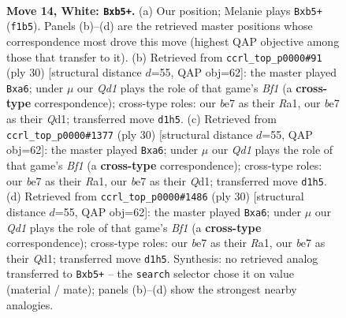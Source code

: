 \documentclass[11pt]{article}
\begin{document}
\clearpage

\begin{figure}[p]\centering
\begin{subfigure}{0.46\textwidth}\centering
\resizebox{\linewidth}{!}{%
\newchessgame
\chessboard[
  setfen={rnbqk2r/4bp2/8/pp1p3p/3Pp2P/8/PP3PP1/R2QKBNR w KQkq - 0 14},
  showmover=false,
  pgfstyle=straightmove, color=movearrow, markmove={f1-b5}
]}
\caption{}
\end{subfigure}\hfill
\begin{subfigure}{0.46\textwidth}\centering
\resizebox{\linewidth}{!}{%
\newchessgame
\chessboard[
  setfen={1r1qk2r/3b1ppp/p2p4/3Np1b1/pP2P3/8/1P3PPP/R2QKB1R w KQk - 1 16},
  showmover=false,
  pgfstyle=straightmove, color=movearrow, markmove={f1-a6}
]}
\caption{}
\end{subfigure}
\\[4pt]
\begin{subfigure}{0.46\textwidth}\centering
\resizebox{\linewidth}{!}{%
\newchessgame
\chessboard[
  setfen={1r1qk2r/3b1ppp/p2p4/3Np1b1/pP2P3/8/1P3PPP/R2QKB1R w KQk - 1 16},
  showmover=false,
  pgfstyle=straightmove, color=movearrow, markmove={f1-a6}
]}
\caption{}
\end{subfigure}\hfill
\begin{subfigure}{0.46\textwidth}\centering
\resizebox{\linewidth}{!}{%
\newchessgame
\chessboard[
  setfen={1r1qk2r/3b1ppp/p2p4/3Np1b1/pP2P3/8/1P3PPP/R2QKB1R w KQk - 1 16},
  showmover=false,
  pgfstyle=straightmove, color=movearrow, markmove={f1-a6}
]}
\caption{}
\end{subfigure}
\caption{\textbf{Move 14, White: \texttt{Bxb5+}.} (a) Our position; Melanie plays \texttt{Bxb5+} (\texttt{f1b5}). Panels (b)--(d) are the retrieved master positions whose correspondence most drove this move (highest QAP objective among those that transfer to it). (b) Retrieved from \texttt{ccrl\_top\_p0000\#91} (ply 30) [structural distance $d$=55, QAP obj=62]: the master played \texttt{Bxa6}; under $\mu$ our \emph{Qd1} plays the role of that game's \emph{Bf1} (a \textbf{cross-type} correspondence); cross-type roles: our \emph{b}e7 as their \emph{R}a1, our \emph{b}e7 as their \emph{Q}d1; transferred move \texttt{d1h5}. (c) Retrieved from \texttt{ccrl\_top\_p0000\#1377} (ply 30) [structural distance $d$=55, QAP obj=62]: the master played \texttt{Bxa6}; under $\mu$ our \emph{Qd1} plays the role of that game's \emph{Bf1} (a \textbf{cross-type} correspondence); cross-type roles: our \emph{b}e7 as their \emph{R}a1, our \emph{b}e7 as their \emph{Q}d1; transferred move \texttt{d1h5}. (d) Retrieved from \texttt{ccrl\_top\_p0000\#1486} (ply 30) [structural distance $d$=55, QAP obj=62]: the master played \texttt{Bxa6}; under $\mu$ our \emph{Qd1} plays the role of that game's \emph{Bf1} (a \textbf{cross-type} correspondence); cross-type roles: our \emph{b}e7 as their \emph{R}a1, our \emph{b}e7 as their \emph{Q}d1; transferred move \texttt{d1h5}. Synthesis: no retrieved analog transferred to \texttt{Bxb5+} -- the \texttt{search} selector chose it on value (material / mate); panels (b)--(d) show the strongest nearby analogies.}
\label{fig:thought-m26}
\end{figure}
\end{document}
